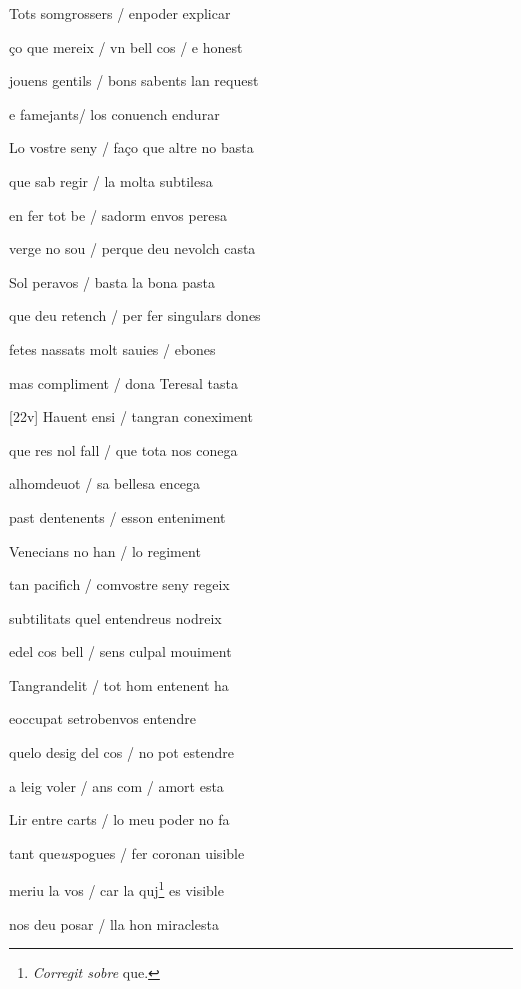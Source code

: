 \documentclass[12pt]{article}
\begin{document}
\begin{estrofa}

 Tots somgrossers / enpoder explicar

 \c{c}o que mereix / vn bell cos / e honest

 jouens gentils / bons sabents lan request

 e famejants/  los conuench endurar

 Lo vostre seny / fa\c{c}o que altre no basta

 que sab regir / la molta subtilesa

 en fer tot be / sadorm envos peresa

 verge no sou / perque deu nevolch casta

\end{estrofa}



\begin{estrofa}

 Sol peravos / basta la bona pasta

 que deu retench / per fer singulars dones

 fetes nassats molt sauies / ebones

 mas compliment / dona Teresal tasta

 [22v] Hauent ensi / tangran coneximent

 que res nol fall / que tota nos conega

 alhomdeuot / sa bellesa encega

 past dentenents / esson enteniment

\end{estrofa}



\begin{estrofa}

 Venecians no han / lo regiment

 tan pacifich / comvostre seny regeix

 subtilitats quel entendreus nodreix

 edel cos bell / sens culpal mouiment

 Tangrandelit / tot hom entenent ha

 eoccupat setrobenvos entendre

 quelo desig del cos / no pot estendre

 a leig voler / ans com / amort esta

\end{estrofa}



\begin{estrofa}

 Lir entre carts / lo meu poder no fa

 tant que\textit{us}pogues / fer coronan uisible

 meriu la vos / car la quj\footnote{\textit{Corregit sobre }que.} es visible

 nos deu posar / lla hon miraclesta

\end{estrofa}
\end{document}
